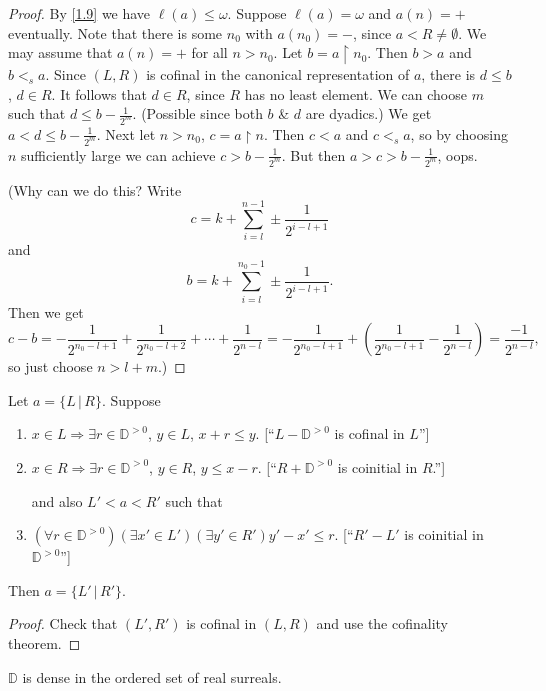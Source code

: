 \begin{proof}
By \eqref{1.9} we have $\ell(a)\le\omega$. Suppose $\ell(a) = \omega$ and $a(n) = +$ eventually. Note that there is some $n_0$ with $a(n_0) = {-}$, since $a<R\ne\emptyset$. We may assume that $a(n) = {+}$ for all $n>n_0$. Let $b = a\restriction n_0$. Then $b>a$ and $b<_s a$. Since $(L,R)$ is cofinal in the canonical representation of $a$, there is $d\le b$, $d\in R$. It follows that $d\in R$, since $R$ has no least element. We can choose $m$ such that $d\le b - \frac1{2^m}$. (Possible since both $b$ \& $d$ are dyadics.) We get $a<d\le b - \frac1{2^m}$. Next let $n>n_0$, $c = a\restriction n$. Then
$c<a$ and $c <_s a$, so by choosing $n$ sufficiently large we can achieve $c>b-\frac1{2^m}$. But then $a>c>b-\frac{1}{2^m}$, oops.

(Why can we do this? Write
\[ c = k + \sum_{i= l}^{n-1} \pm\frac{1}{2^{i-l+1}}\]
and
\[ b = k + \sum_{i=l}^{n_0-1} \pm\frac{1}{2^{i-l+1}}. \]
Then we get
\[ c-b = -\frac{1}{2^{n_0-l+1}} + \frac{1}{2^{n_0-l+2}} + \cdots + \frac{1}{2^{n-l}} = -\frac{1}{2^{n_0-l+1}} + \left( \frac{1}{2^{n_0-l+1}} - \frac{1}{2^{n-l}} \right) = \frac{-1}{2^{n-l}}, \]
so just choose $n>l+m$.)
\end{proof}

\begin{lemma}
Let $a = \{L \,|\, R\}$. Suppose
\begin{enumerate}
\item $x\in L \Rightarrow \exists r\in \mathbb{D}^{>0}$, $y\in L$, $x+r\le y$. [``$L-\mathbb{D}^{>0}$ is cofinal in $L$'']
\item $x\in R \Rightarrow \exists r\in \mathbb{D}^{>0}$, $y\in R$, $y\le x-r$. [``$R+\mathbb{D}^{>0}$ is coinitial in $R$.'']

and also $L' < a < R'$ such that
\item $(\forall r\in \mathbb{D}^{>0})(\exists x'\in L')(\exists y'\in R') y'-x'\le r$. [``$R'-L'$ is coinitial in $\mathbb{D}^{>0}$'']
\end{enumerate}
Then $a = \{ L' \,|\, R' \}$. 
\end{lemma}

\begin{proof}
Check that $(L',R')$ is cofinal in $(L,R)$ and use the cofinality theorem.
\end{proof}

\begin{lemma}
$\mathbb{D}$ is dense in the ordered set of real surreals.
\end{lemma}

